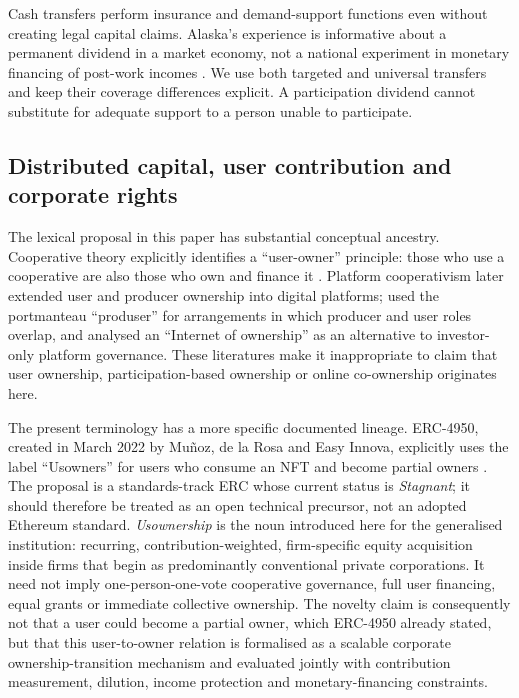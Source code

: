 Cash transfers perform insurance and demand-support functions even without creating legal capital claims. Alaska's experience is informative about a permanent dividend in a market economy, not a national experiment in monetary financing of post-work incomes \citep{jonesmarinescu2020,bibler2023}. We use both targeted and universal transfers and keep their coverage differences explicit. A participation dividend cannot substitute for adequate support to a person unable to participate.

\subsection{Distributed capital, user contribution and corporate rights}
The lexical proposal in this paper has substantial conceptual ancestry. Cooperative theory explicitly identifies a ``user-owner'' principle: those who use a cooperative are also those who own and finance it \citep{dunn1988,zeuliradel2005}. Platform cooperativism later extended user and producer ownership into digital platforms; \citet{scholz2016} used the portmanteau ``produser'' for arrangements in which producer and user roles overlap, and \citet{schneider2018} analysed an ``Internet of ownership'' as an alternative to investor-only platform governance. These literatures make it inappropriate to claim that user ownership, participation-based ownership or online co-ownership originates here.

The present terminology has a more specific documented lineage. ERC-4950, created in March 2022 by Mu\~noz, de la Rosa and Easy Innova, explicitly uses the label ``Usowners'' for users who consume an NFT and become partial owners \citep{erc4950}. The proposal is a standards-track ERC whose current status is \emph{Stagnant}; it should therefore be treated as an open technical precursor, not an adopted Ethereum standard. \emph{Usownership} is the noun introduced here for the generalised institution: recurring, contribution-weighted, firm-specific equity acquisition inside firms that begin as predominantly conventional private corporations. It need not imply one-person-one-vote cooperative governance, full user financing, equal grants or immediate collective ownership. The novelty claim is consequently not that a user could become a partial owner, which ERC-4950 already stated, but that this user-to-owner relation is formalised as a scalable corporate ownership-transition mechanism and evaluated jointly with contribution measurement, dilution, income protection and monetary-financing constraints.

